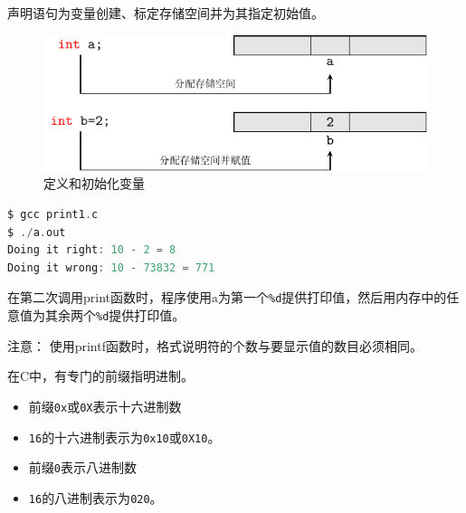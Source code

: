 %
\begin{frame}[fragile]
  声明语句为变量创建、标定存储空间并为其指定初始值。 \pause 

  \begin{figure}
    \centering
    \includegraphics[]{ch03/images/var_def_and_init}
    \caption{定义和初始化变量}
  \end{figure}


\end{frame}
% 
%
\begin{frame}[fragile]

 
\end{frame}
% 
%
\begin{frame}[fragile]
\begin{lstlisting}[language=c]
$ gcc print1.c
$ ./a.out
Doing it right: 10 - 2 = 8
Doing it wrong: 10 - 73832 = 771
\end{lstlisting}
\end{frame}
\begin{frame}[fragile]
在第二次调用print函数时，程序使用a为第一个\lstinline|%d|提供打印值，然后用内存中的任意值为其余两个\lstinline|%d|提供打印值。\vspace{0.1in}

注意： 使用printf函数时，格式说明符的个数与要显示值的数目必须相同。
\end{frame}
%
%
\begin{frame}[fragile]
在C中，有专门的前缀指明进制。

\begin{itemize}
\item 前缀\lstinline|0x|或\lstinline|0X|表示十六进制数\\[0.1in]
\item[] \lstinline|16|的十六进制表示为\lstinline|0x10|或\lstinline|0X10|。\\[0.2in]
\item 前缀\lstinline|0|表示八进制数\\[0.1in]
\item[] \lstinline|16|的八进制表示为\lstinline|020|。
\end{itemize}
\end{frame}


